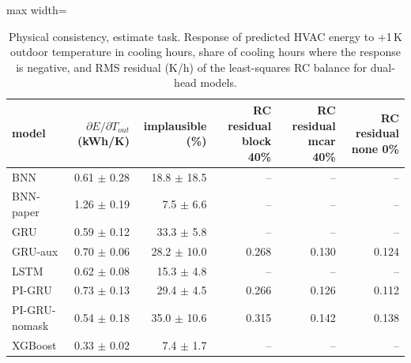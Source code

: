 \begin{table}[H]
\centering\small
\caption{Physical consistency, estimate task. Response of predicted HVAC energy to +1\,K outdoor temperature in cooling hours, share of cooling hours where the response is negative, and RMS residual (K/h) of the least-squares RC balance for dual-head models.}\label{tab:phys_estimate}
\begin{adjustbox}{max width=\textwidth}
\begin{tabular}{lrrrrr}
\toprule
model & $\partial E/\partial T_{out}$ (kWh/K) & implausible (\%) & RC residual block 40\% & RC residual mcar 40\% & RC residual none 0\% \\
\midrule
BNN & 0.61 $\pm$ 0.28 & 18.8 $\pm$ 18.5 & -- & -- & -- \\
BNN-paper & 1.26 $\pm$ 0.19 & 7.5 $\pm$ 6.6 & -- & -- & -- \\
GRU & 0.59 $\pm$ 0.12 & 33.3 $\pm$ 5.8 & -- & -- & -- \\
GRU-aux & 0.70 $\pm$ 0.06 & 28.2 $\pm$ 10.0 & 0.268 & 0.130 & 0.124 \\
LSTM & 0.62 $\pm$ 0.08 & 15.3 $\pm$ 4.8 & -- & -- & -- \\
PI-GRU & 0.73 $\pm$ 0.13 & 29.4 $\pm$ 4.5 & 0.266 & 0.126 & 0.112 \\
PI-GRU-nomask & 0.54 $\pm$ 0.18 & 35.0 $\pm$ 10.6 & 0.315 & 0.142 & 0.138 \\
XGBoost & 0.33 $\pm$ 0.02 & 7.4 $\pm$ 1.7 & -- & -- & -- \\
\bottomrule
\end{tabular}
\end{adjustbox}
\end{table}
